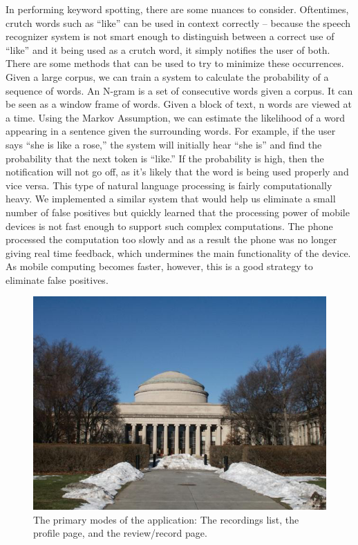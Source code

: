 \documentclass{sigchi}
\begin{document}
In performing keyword spotting, there are some nuances to consider. Oftentimes, crutch words such as “like” can be used in context correctly -- because the speech recognizer system is not smart enough to distinguish between a correct use of “like” and it being used as a crutch word, it simply notifies the user of both. There are some methods that can be used to try to minimize these occurrences. Given a large corpus, we can train a system to calculate the probability of a sequence of words. An N-gram is a set of consecutive words given a corpus. It can be seen as a window frame of words. Given a block of text, n words are viewed at a time. Using the Markov Assumption, we can estimate the likelihood of a word appearing in a sentence given the surrounding words. For example, if the user says “she is like a rose,” the system will initially hear “she is” and find the probability that the next token is “like.” If the probability is high, then the notification will not go off, as it’s likely that the word is being used properly and vice versa. This type of natural language processing is fairly computationally heavy. We implemented a similar system that would help us eliminate a small number of false positives but quickly learned that the processing power of mobile devices is not fast enough to support such complex computations. The phone processed the computation too slowly and as a result the phone was no longer giving real time feedback, which undermines the main functionality of the device. As mobile computing becomes faster, however, this is a good strategy to eliminate false positives.


\begin{figure}[!h]
\centering
\includegraphics[width=0.9\columnwidth]{Figure1}
\caption{The primary modes of the application: The recordings list, the profile page, and the review/record page.
}
\label{fig:figure1}
\end{figure}
\end{document}
